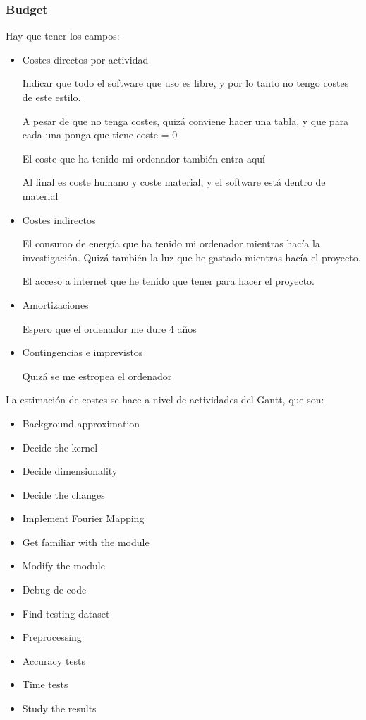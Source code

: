 \documentclass[a4paper]{article}
\begin{document}
            \subsubsection{Budget}
            Hay que tener los campos:
            \begin{itemize}
                \item Costes directos por actividad

                    Indicar que todo el software que uso es libre, y por lo tanto no tengo costes de este estilo.

                    A pesar de que no tenga costes, quizá conviene hacer una tabla, y que para cada una ponga que tiene coste = 0

                    El coste que ha tenido mi ordenador también entra aquí

                    Al final es coste humano y coste material, y el software está dentro de material

                \item Costes indirectos

                    El consumo de energía que ha tenido mi ordenador mientras hacía la investigación. Quizá también la luz que he gastado mientras hacía el proyecto.

                    El acceso a internet que he tenido que tener para hacer el proyecto.

                \item Amortizaciones

                Espero que el ordenador me dure 4 años

                \item Contingencias e imprevistos

                Quizá se me estropea el ordenador
            \end{itemize}
            La estimación de costes se hace a nivel de actividades del Gantt, que son:
            \begin{itemize}
                \item Background approximation
                \item Decide the kernel
                \item Decide dimensionality
                \item Decide the changes
                \item Implement Fourier Mapping
                \item Get familiar with the module
                \item Modify the module
                \item Debug de code
                \item Find testing dataset
                \item Preprocessing
                \item Accuracy tests
                \item Time tests
                \item Study the results

            \end{itemize}
\end{document}
